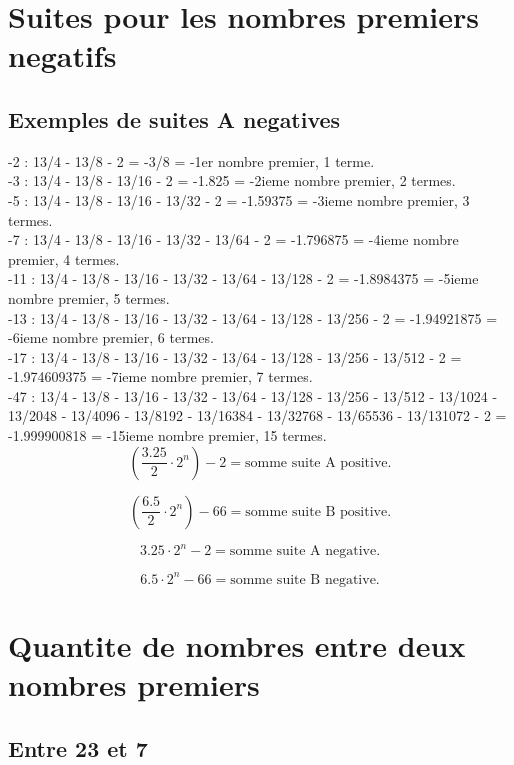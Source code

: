 \documentclass[a4paper,11pt]{article}
\begin{document}
\section*{Suites pour les nombres premiers negatifs}

\subsection*{Exemples de suites A negatives}

-2 : 13/4 - 13/8 - 2 = -3/8 = -1er nombre premier, 1 terme.\\
-3 : 13/4 - 13/8 - 13/16 - 2 = -1.825 = -2ieme nombre premier, 2 termes.\\
-5 : 13/4 - 13/8 - 13/16 - 13/32 - 2 = -1.59375 = -3ieme nombre premier, 3 termes.\\
-7 : 13/4 - 13/8 - 13/16 - 13/32 - 13/64 - 2 = -1.796875 = -4ieme nombre premier, 4 termes.\\
-11 : 13/4 - 13/8 - 13/16 - 13/32 - 13/64 - 13/128 - 2 = -1.8984375 = -5ieme nombre premier, 5 termes.\\
-13 : 13/4 - 13/8 - 13/16 - 13/32 - 13/64 - 13/128 - 13/256 - 2 = -1.94921875 = -6ieme nombre premier, 6 termes.\\
-17 : 13/4 - 13/8 - 13/16 - 13/32 - 13/64 - 13/128 - 13/256 - 13/512 - 2 = -1.974609375 = -7ieme nombre premier, 7 termes.\\

-47 : 13/4 - 13/8 - 13/16 - 13/32 - 13/64 - 13/128 - 13/256 - 13/512 - 13/1024 - 13/2048 - 13/4096 - 13/8192 - 13/16384 - 13/32768 - 13/65536 - 13/131072 - 2 = -1.999900818 = -15ieme nombre premier, 15 termes.\\

\[
\left(\frac{3.25}{2} \cdot 2^{n}\right) - 2 = \text{somme suite A positive.}
\]

\[
\left(\frac{6.5}{2} \cdot 2^{n}\right) - 66 = \text{somme suite B positive.}
\]

\[
3.25 \cdot 2^{n} - 2 = \text{somme suite A negative.}
\]

\[
6.5 \cdot 2^{n} - 66 = \text{somme suite B negative.}
\]

\section*{Quantite de nombres entre deux nombres premiers}

\subsection*{Entre 23 et 7}
\end{document}
